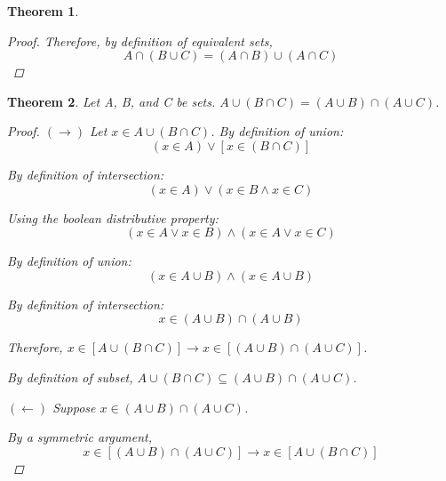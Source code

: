 \documentclass{article}
\newtheorem{theorem}{Theorem}
\numberwithin{subcase}{case}
\begin{document}
\begin{outline}[enumerate]
\begin{theorem}
\begin{proof}
            Therefore, by definition of equivalent sets, 
            \begin{equation}
                A \cap (B \cup C) = (A \cap B) \cup (A \cap C)
            \end{equation}
        \end{proof}
        
    \end{theorem}

    \1 \begin{theorem}
        Let A, B, and C be sets. $A \cup (B \cap C) = (A \cup B) \cap (A \cup C)$.

        \begin{proof}
            $(\rightarrow)$ Let $x \in A \cup (B \cap C)$. By definition of union: 
            \begin{equation}
                (x \in A) \vee [x \in (B \cap C)]
            \end{equation}

            By definition of intersection: 
            \begin{equation}
                (x \in A) \vee (x \in B \wedge x \in C)
            \end{equation}
        
            Using the boolean distributive property: 
            \begin{equation}
                (x \in A \vee x \in B) \wedge (x \in A \vee x \in C)
            \end{equation}

            By definition of union: 
            \begin{equation}
                (x \in A \cup B) \wedge (x \in A \cup B)
            \end{equation}

            By definition of intersection:
            \begin{equation}
                x \in (A \cup B) \cap (A \cup B)
            \end{equation}

            Therefore, $x \in [A \cup (B \cap C)] \rightarrow x \in [(A \cup B) \cap (A \cup C)]$.

            By definition of subset, $A \cup (B \cap C) \subseteq (A \cup B) \cap (A \cup C)$.

            $(\leftarrow)$ Suppose $x \in (A \cup B) \cap (A \cup C)$. 
            
            By a symmetric argument,
            \begin{equation}
                x \in [(A \cup B) \cap (A \cup C)] \rightarrow x \in [A \cup (B \cap C)]  
            \end{equation}
            

\end{proof}
\end{theorem}
\end{outline}
\end{document}
